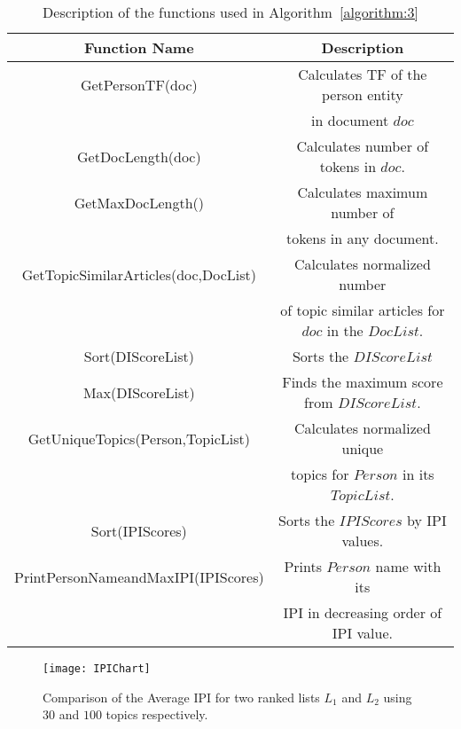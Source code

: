 \begin{table*}
\begin{center}
\begin{tabular}{|c|c|} \hline
Function Name & Description \\ \hline
GetPersonTF(doc) & Calculates TF of the person entity \\
 & in document $doc$ \\ \hline
GetDocLength(doc) & Calculates number of tokens in $doc$. \\ \hline
GetMaxDocLength() & Calculates maximum number of \\
& tokens in any document.\\ \hline
GetTopicSimilarArticles(doc,DocList) &  Calculates normalized number \\
& of topic similar articles for $doc$ in the $DocList$. \\ \hline
Sort(DIScoreList) & Sorts the $DIScoreList$ \\ \hline
Max(DIScoreList) & Finds the maximum score from $DIScoreList$. \\ \hline
GetUniqueTopics(Person,TopicList) & Calculates normalized unique \\
& topics for $Person$ in its $TopicList$. \\ \hline
Sort(IPIScores) & Sorts the $IPIScores$ by IPI values. \\ \hline
PrintPersonNameandMaxIPI(IPIScores) & Prints $Person$ name with its \\
& IPI in decreasing order of IPI value. \\ \hline
\end{tabular}
\end{center}
\caption{Description of the functions used in Algorithm~\ref{algorithm:3}}
\label{default}
\end{table*}%

\begin{figure*}
\begin{center}
\texttt{[image: IPIChart]}
\end{center}
\caption{Comparison of the Average IPI for two ranked lists $L_1$ and $L_2$ using $30$ and $100$ topics respectively.}
\label{figure:IPI}
\end{figure*}

